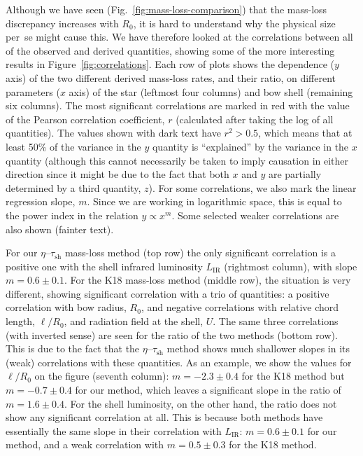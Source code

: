 \documentclass[useAMS, usenatbib, a4paper]{mnras}
\newcommand\IR{\ensuremath{_{\text{IR}}}}
\newcommand\shell{\ensuremath{_{\text{sh}}}}
\begin{document}
Although we have seen (Fig.~\ref{fig:mass-loss-comparison}) that the
mass-loss discrepancy increases with \(R_0\), it is hard to understand
why the physical size per~se might cause this.  We have therefore
looked at the correlations between all of the observed and derived
quantities, showing some of the more interesting results in
Figure~\ref{fig:correlations}.  Each row of plots shows the dependence
(\(y\) axis) of the two different derived mass-loss rates, and their
ratio, on different parameters (\(x\) axis) of the star (leftmost four
columns) and bow shell (remaining six columns).  The most significant
correlations are marked in red with the value of the Pearson
correlation coefficient, \(r\) (calculated after taking the log of all
quantities).  The values shown with dark text have \(r^2 > 0.5\),
which means that at least 50\% of the variance in the \(y\) quantity
is ``explained'' by the variance in the \(x\) quantity (although this
cannot necessarily be taken to imply causation in either direction
since it might be due to the fact that both \(x\) and \(y\) are
partially determined by a third quantity, \(z\)). For some
correlations, we also mark the linear regression slope, \(m\).  Since
we are working in logarithmic space, this is equal to the power index
in the relation \(y \propto x^m\).  Some selected weaker correlations
are also shown (fainter text).

For our \(\eta\)--\(\tau\shell\) mass-loss method (top row) the only
significant correlation is a positive one with the shell infrared
luminosity \(L\IR\) (rightmost column), with slope
\(m = 0.6 \pm 0.1\).  For the K18 mass-loss method (middle row), the
situation is very different, showing significant correlation with a
trio of quantities: a positive correlation with bow radius, \(R_0\),
and negative correlations with relative chord length, \(\ell/R_0\),
and radiation field at the shell, \(U\).  The same three correlations
(with inverted sense) are seen for the ratio of the two methods
(bottom row).  This is due to the fact that the
\(\eta\)--\(\tau\shell\) method shows much shallower slopes in its
(weak) correlations with these quantities.  As an example, we show the
values for \(\ell/R_0\) on the figure (seventh column):
\(m = -2.3 \pm 0.4\) for the K18 method but \(m = -0.7 \pm 0.4\) for
our method, which leaves a significant slope in the ratio of
\(m = 1.6 \pm 0.4\).  For the shell luminosity, on the other hand, the
ratio does not show any significant correlation at all.  This is
because both methods have essentially the same slope in their
correlation with \(L\IR\): \(m = 0.6 \pm 0.1\) for our method, and a
weak correlation with \(m = 0.5 \pm 0.3\) for the K18 method.
\end{document}
